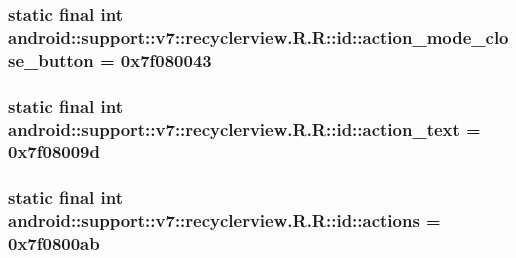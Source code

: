 \hypertarget{classandroid_1_1support_1_1v7_1_1recyclerview_1_1_r_1_1id_c0e2dff38be9b66b0b19b78055674bfa}{
\subsubsection[{action\_\-mode\_\-close\_\-button}]{\setlength{\rightskip}{0pt plus 5cm}static final int android::support::v7::recyclerview.R.R::id::action\_\-mode\_\-close\_\-button = 0x7f080043}}
\label{classandroid_1_1support_1_1v7_1_1recyclerview_1_1_r_1_1id_c0e2dff38be9b66b0b19b78055674bfa}


\hypertarget{classandroid_1_1support_1_1v7_1_1recyclerview_1_1_r_1_1id_b7806c06fa571fe2461f8824e63c023d}{
\subsubsection[{action\_\-text}]{\setlength{\rightskip}{0pt plus 5cm}static final int android::support::v7::recyclerview.R.R::id::action\_\-text = 0x7f08009d}}
\label{classandroid_1_1support_1_1v7_1_1recyclerview_1_1_r_1_1id_b7806c06fa571fe2461f8824e63c023d}


\hypertarget{classandroid_1_1support_1_1v7_1_1recyclerview_1_1_r_1_1id_8bcdc4546ef383611a39ef6bd3344c64}{
\subsubsection[{actions}]{\setlength{\rightskip}{0pt plus 5cm}static final int android::support::v7::recyclerview.R.R::id::actions = 0x7f0800ab}}
\label{classandroid_1_1support_1_1v7_1_1recyclerview_1_1_r_1_1id_8bcdc4546ef383611a39ef6bd3344c64}



